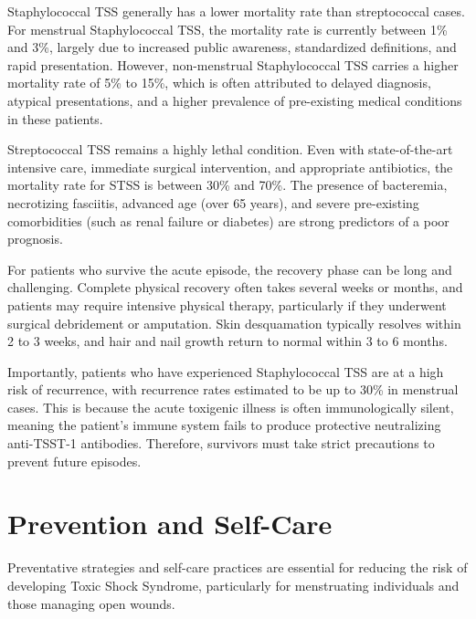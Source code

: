 Staphylococcal TSS generally has a lower mortality rate than streptococcal cases. For menstrual Staphylococcal TSS, the mortality rate is currently between 1\% and 3\%, largely due to increased public awareness, standardized definitions, and rapid presentation. However, non-menstrual Staphylococcal TSS carries a higher mortality rate of 5\% to 15\%, which is often attributed to delayed diagnosis, atypical presentations, and a higher prevalence of pre-existing medical conditions in these patients.

Streptococcal TSS remains a highly lethal condition. Even with state-of-the-art intensive care, immediate surgical intervention, and appropriate antibiotics, the mortality rate for STSS is between 30\% and 70\%. The presence of bacteremia, necrotizing fasciitis, advanced age (over 65 years), and severe pre-existing comorbidities (such as renal failure or diabetes) are strong predictors of a poor prognosis.

For patients who survive the acute episode, the recovery phase can be long and challenging. Complete physical recovery often takes several weeks or months, and patients may require intensive physical therapy, particularly if they underwent surgical debridement or amputation. Skin desquamation typically resolves within 2 to 3 weeks, and hair and nail growth return to normal within 3 to 6 months.

Importantly, patients who have experienced Staphylococcal TSS are at a high risk of recurrence, with recurrence rates estimated to be up to 30\% in menstrual cases. This is because the acute toxigenic illness is often immunologically silent, meaning the patient's immune system fails to produce protective neutralizing anti-TSST-1 antibodies. Therefore, survivors must take strict precautions to prevent future episodes.

\section*{Prevention and Self-Care}
Preventative strategies and self-care practices are essential for reducing the risk of developing Toxic Shock Syndrome, particularly for menstruating individuals and those managing open wounds.

